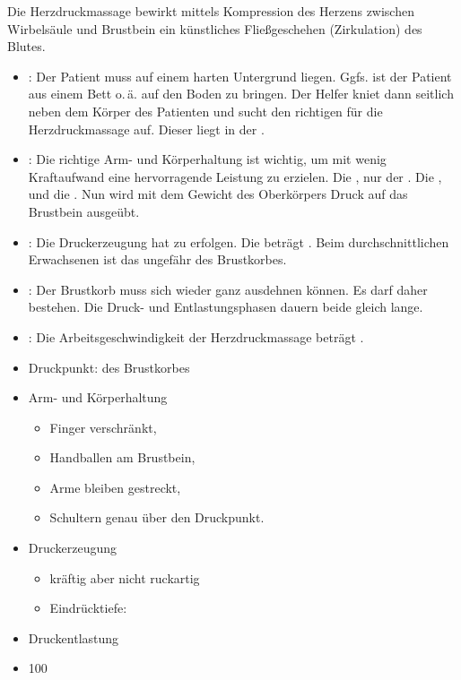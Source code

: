 {Die Herzdruckmassage bewirkt mittels Kompression des Herzens
zwischen Wirbelsäule und Brustbein ein künstliches Fließgeschehen
(Zirkulation) des Blutes.

\begin{itemize}
  \item {}: Der Patient muss auf
  einem harten Untergrund liegen. Ggfs. ist der Patient aus einem Bett
  o.\,ä. auf den Boden zu bringen. Der Helfer kniet
  dann seitlich neben dem Körper des Patienten und sucht
  den richtigen  für die Herzdruckmassage
  auf. Dieser liegt in der .
  \item {}: Die richtige
  Arm- und Körperhaltung ist wichtig, um mit wenig Kraftaufwand eine
  hervorragende Leistung zu erzielen. Die , nur der .
  Die , und die . Nun wird mit dem Gewicht des Oberkörpers
  Druck auf das Brustbein ausgeübt.
  \item {}: Die
  Druckerzeugung hat  zu
  erfolgen. Die
   beträgt . Beim
  durchschnittlichen Erwachsenen ist das ungefähr  des
  Brustkorbes.
  \item {}: Der Brustkorb muss sich wieder
  ganz ausdehnen können. Es darf daher 
  bestehen. Die Druck- und Entlastungsphasen dauern beide
  gleich lange.
  \item {}: Die
  Arbeitsgeschwindigkeit der Herzdruckmassage beträgt .
\end{itemize}


}{
\begin{itemize}
  \item Druckpunkt:  des Brustkorbes
  \item Arm- und Körperhaltung
  \begin{itemize}
    \item Finger verschränkt,
    \item Handballen am Brustbein,
    \item Arme bleiben gestreckt,
    \item Schultern genau über den Druckpunkt.
  \end{itemize}
  \item Druckerzeugung
  \begin{itemize}
    \item kräftig aber nicht ruckartig
    \item Eindrücktiefe: \CM*
  \end{itemize}
  \item Druckentlastung
  \item 100\PerMin*
\end{itemize}
}{}{}{}

